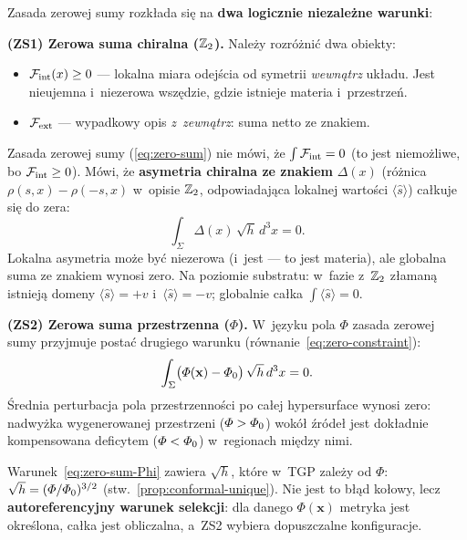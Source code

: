 \begin{remark}\label{rem:zero-precyzacja}
Zasada zerowej sumy rozk\l{}ada si\k{e} na \textbf{dwa
logicznie niezale\.zne warunki}:

\medskip\noindent
\textbf{(ZS1) Zerowa suma chiralna ($\mathbb{Z}_2$).}
Nale\.zy rozr\'o\.zni\'c dwa obiekty:
\begin{itemize}[nosep]
  \item $\mathcal{F}_{\mathrm{int}}(x) \geq 0$ --- lokalna miara
        odej\'scia od symetrii \emph{wewn\k{a}trz} uk\l{}adu.
        Jest nieujemna i~niezerowa wsz\k{e}dzie, gdzie istnieje
        materia i~przestrze\'n.
  \item $\mathcal{F}_{\mathrm{ext}}$ --- wypadkowy opis
        \emph{z~zewn\k{a}trz}: suma netto ze znakiem.
\end{itemize}
Zasada zerowej sumy (\ref{eq:zero-sum}) nie m\'owi, \.ze
$\int \mathcal{F}_{\mathrm{int}} = 0$ (to jest niemo\.zliwe,
bo $\mathcal{F}_{\mathrm{int}} \geq 0$). M\'owi, \.ze
\textbf{asymetria chiralna ze znakiem} $\Delta(x)$
(r\'o\.znica $\rho(s,x) - \rho(-s,x)$ w~opisie $\mathbb{Z}_2$,
odpowiadaj\k{a}ca lokalnej warto\'sci $\langle\hat{s}\rangle$)
ca\l{}kuje si\k{e} do zera:
\begin{equation}\label{eq:zero-sum-precise}
    \int_\Sigma \Delta(x)\,\sqrt{h}\,d^3x = 0.
\end{equation}
Lokalna asymetria mo\.ze by\'c niezerowa (i~jest --- to jest
materia), ale globalna suma ze znakiem wynosi zero.
Na poziomie substratu: w~fazie z~$\mathbb{Z}_2$ z\l{}aman\k{a}
istniej\k{a} domeny $\langle\hat{s}\rangle = +v$
i~$\langle\hat{s}\rangle = -v$; globalnie ca\l{}ka
$\int\langle\hat{s}\rangle = 0$.

\medskip\noindent
\textbf{(ZS2) Zerowa suma przestrzenna ($\Phi$).}
W~j\k{e}zyku pola $\Phi$ zasada zerowej sumy
przyjmuje posta\'c drugiego warunku
(r\'ownanie~\ref{eq:zero-constraint}):
\begin{equation}\label{eq:zero-sum-Phi}
    \int_\Sigma \bigl(\varPhi(\mathbf{x}) - \varPhi_0\bigr)\,
    \sqrt{h}\,d^3x = 0.
\end{equation}
\'Srednia perturbacja pola przestrzenno\'sci po ca\l{}ej
hypersurface wynosi zero: nadwy\.zka wygenerowanej
przestrzeni ($\varPhi > \varPhi_0$) wok\'o\l{} \'zr\'ode\l{}
jest dok\l{}adnie kompensowana deficytem
($\varPhi < \varPhi_0$) w~regionach mi\k{e}dzy nimi.

\begin{remark}[Autoreferencyjno\'s\'c ZS2]\label{rem:ZS2-self-ref}
Warunek~\eqref{eq:zero-sum-Phi} zawiera $\sqrt{h}$,
kt\'ore w~TGP zale\.zy od $\Phi$:
$\sqrt{h} = (\varPhi/\varPhi_0)^{3/2}$
(stw.~\ref{prop:conformal-unique}).
Nie jest to b\l{}\k{a}d ko\l{}owy, lecz
\textbf{autoreferencyjny warunek selekcji}:
dla danego $\Phi(\mathbf{x})$ metryka jest
okre\'slona, ca\l{}ka jest obliczalna,
a~ZS2 wybiera dopuszczalne konfiguracje.


\end{remark}
\end{remark}
